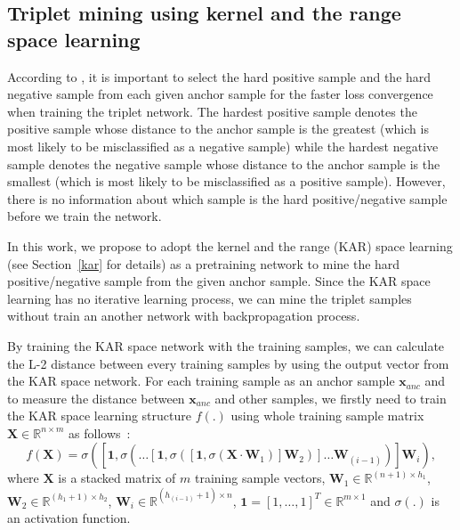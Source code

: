 \documentclass[runningheads]{llncs}
\begin{document}
\subsection{Triplet mining using kernel and the range space learning}
According to \cite{schroff2015facenet}, it is important to select the hard positive sample and the hard negative sample from each given anchor sample for the faster loss convergence when training the triplet network.
The hardest positive sample denotes the positive sample whose distance to the anchor sample is the greatest (which is most likely to be misclassified as a negative sample) while the hardest negative sample denotes the negative sample whose distance to the anchor sample is the smallest (which is most likely to be misclassified as a positive sample). However, there is no information about which sample is the hard positive/negative sample before we train the network.

In this work, we propose to adopt the kernel and the range (KAR) space learning (see Section~\ref{kar} for details) as a pretraining network to mine the hard positive/negative sample from the given anchor sample. Since the KAR space learning has no iterative learning process, we can mine the triplet samples without train an another network with backpropagation process.
 
By training the KAR space network with the training samples, we can calculate the L-2 distance between every training samples by using the output vector from the KAR space network. For each training sample as an anchor sample $\mathbf{x}_{anc}$ and to measure the distance between $\mathbf{x}_{anc}$ and other samples, we firstly need to train the KAR space learning structure $f\left(.\right)$ using whole training sample matrix $\mathbf{X}\in \mathbb{R}^{n\times m}$ as follows~\cite{toh2018gradient}:
\begin{equation}
    f\left(\mathbf{X}\right) = \sigma\left(\left[\mathbf{1},\sigma\left(\dots\left[\mathbf{1},\sigma\left(\left[\mathbf{1},\sigma\left(\mathbf{X}\cdot\mathbf{W}_{1}\right)\right]\mathbf{W}_{2}\right)\right]\dots\mathbf{W}_{(i-1)}\right)\right]\mathbf{W}_{i}\right),
\end{equation}
where $\mathbf{X}$ is a stacked matrix of $m$ training sample vectors, $\mathbf{W}_{1}\in{\mathbb{R}}^{(n+1) \times h_{1}}$, $\mathbf{W}_{2}\in{\mathbb{R}}^{(h_{1}+1) \times h_{2}}$, $\mathbf{W}_{i}\in{\mathbb{R}}^{(h_{(i-1)}+1) \times n}$, $\mathbf{1}=\left[1,\dots,1\right]^{T}\in{\mathbb{R}}^{m \times 1}$ and $\sigma(.)$ is an activation function.
\end{document}

